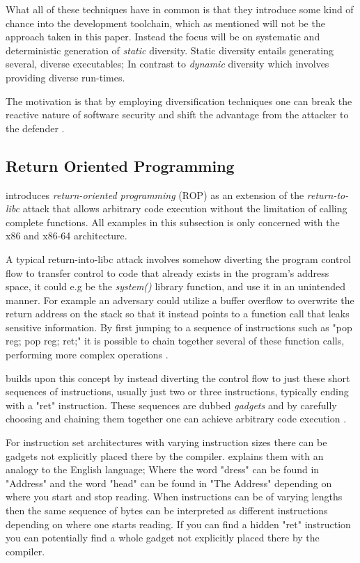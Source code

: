What all of these techniques have in common is that they introduce some kind of chance into
the development toolchain, which as mentioned will not be the approach taken in this paper.
Instead the focus will be on systematic and deterministic generation of \textit{static}
diversity. Static diversity entails generating several, diverse executables; In contrast
to \textit{dynamic} diversity which involves providing diverse run-times\cite{survey}.

The motivation is that by employing diversification techniques one can break the
reactive nature of software security and shift the advantage from the attacker to the
defender \cite{compiler-generated-sw-div}.

\subsection{Return Oriented Programming}
\label{rop}

\textcite{rop} introduces \textit{return-oriented programming} (ROP) as an extension of
the \textit{return-to-libc}\cite{return-into-libc} attack that allows arbitrary code
execution without the limitation of calling complete functions. All examples in this
subsection is only concerned with the x86 and x86-64 architecture.

A typical return-into-libc attack involves somehow diverting the program control
flow to transfer control to code that already exists in the program's address space,
it could e.g be the \textit{system()} library function, and use it in an unintended manner.
For example an adversary could utilize a buffer overflow to overwrite the return address on
the stack so that it instead points to a function call that leaks sensitive information.
By first jumping to a sequence of instructions such as "pop reg; pop reg; ret;" it is
possible to chain together several of these function calls, performing more complex
operations \cite{non-exec-stack,advanced-return-into-libc}.

\textcite{rop} builds upon this concept by instead diverting the control flow to just these
short sequences of instructions, usually just two or three instructions, typically ending
with a "ret" instruction. These sequences are dubbed \textit{gadgets} and by carefully
choosing and chaining them together one can achieve arbitrary code execution \cite{rop}.

For instruction set architectures with varying instruction sizes there can be gadgets not
explicitly placed there by the compiler. \textcite{rop} explains them with an analogy to
the English language; Where the word "dress" can be found in "Address" and the word "head"
can be found in "The Address" depending on where you start and stop reading. When
instructions can be of varying lengths then the same sequence of bytes can be interpreted
as different instructions depending on where one starts reading. If you can find a hidden
"ret" instruction you can potentially find a whole gadget not explicitly placed there by
the compiler.

